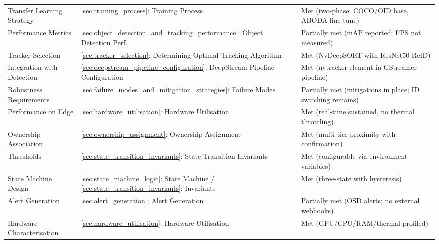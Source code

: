\begin{table}[!htbp]
\begin{tabularx}{\textwidth}{@{\extracolsep{\fill}}>{\raggedright\arraybackslash}X >{\raggedright\arraybackslash}X >{\raggedright\arraybackslash}X}
		\addlinespace
		Transfer Learning Strategy   & \ref{sec:training_process}: Training Process                                                     & Met (two-phase: COCO/OID base, ABODA fine-tune)            \\
		\addlinespace
		Performance Metrics          & \ref{sec:object_detection_and_tracking_performance}: Object Detection Perf.                      & Partially met (mAP reported; FPS not measured)             \\
		\addlinespace
		Tracker Selection            & \ref{sec:tracker_selection}: Determining Optimal Tracking Algorithm                              & Met (NvDeepSORT with ResNet50 ReID)                        \\
		\addlinespace
		Integration with Detection   & \ref{sec:deepstream_pipeline_configuration}: DeepStream Pipeline Configuration                   & Met (nvtracker element in GStreamer pipeline)              \\
		\addlinespace
		Robustness Requirements      & \ref{sec:failure_modes_and_mitigation_strategies}: Failure Modes                                 & Partially met (mitigations in place; ID switching remains) \\
		\addlinespace
		Performance on Edge          & \ref{sec:hardware_utilisation}: Hardware Utilisation                                             & Met (real-time sustained, no thermal throttling)           \\
		\addlinespace
		Ownership Association        & \ref{sec:ownership_assignment}: Ownership Assignment                                             & Met (multi-tier proximity with confirmation)               \\
		\addlinespace
		Thresholds                   & \ref{sec:state_transition_invariants}: State Transition Invariants                               & Met (configurable via environment variables)               \\
		\addlinespace
		State Machine Design         & \ref{sec:state_machine_logic}: State Machine / \ref{sec:state_transition_invariants}: Invariants & Met (three-state with hysteresis)                          \\
		\addlinespace
		Alert Generation             & \ref{sec:alert_generation}: Alert Generation                                                     & Partially met (OSD alerts; no external webhooks)           \\
		\addlinespace
		Hardware Characterisation    & \ref{sec:hardware_utilisation}: Hardware Utilisation                                             & Met (GPU/CPU/RAM/thermal profiled)                         \\

\end{tabularx}
\end{table}
